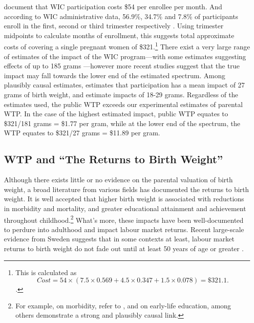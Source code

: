 \documentclass[a4paper, 11pt]{article}
\begin{document}
\begin{spacing}{1.4}
\citet{BenShalometal2011} document that WIC participation costs
\$54 per enrollee per month.  And according to WIC administrative
data, 56.9\%, 34.7\% and 7.8\% of participants enroll in the first,
second or third trimester respectively \citep{Johnsonetal2013}.  Using trimester midpoints
to calculate months of enrollment, this suggests total approximate
costs of covering a single pregnant women of \$321.\footnote{This
  is calculated
  as \[
  Cost = 54\times (7.5\times0.569+4.5\times0.347+1.5\times0.078) = \$321.1.
  \].}
There exist a very large range of estimates of the impact of the WIC
program---with some estimates suggesting effects of up to 185 grams
\citep{KowaleskiJonesDuncan2011}---however more recent studies suggest
that the true impact may fall towards the lower end of the estimated
spectrum.  Among plausibly causal estimates, \citet{RossinSlater2013}
estimates that participation has a mean impact of 27 grams of birth weight,
and \citet{Hoynesetal2011} estimate impacts of 18-29 grams.  Regardless of
the estimates used, the public WTP exceeds our experimental estimates
of parental WTP.  In the case of the highest estimated impact, public
WTP equates to \$321/181 grams = \$1.77 per gram, while at the lower
end of the spectrum, the WTP equates to \$321/27 grams = \$11.89 per gram.




\subsection{WTP and ``The Returns to Birth Weight''}
\label{returnsBW}
Although there exists little or no evidence on the parental valuation of
birth weight, a broad literature from various fields has documented
the returns to birth weight.  It is well accepted that higher birth
weight is associated with reductions in morbidity and mortality, and
greater educational attainment and achievement throughout
childhood.\footnote{For example, on morbidity, refer to
  \citet{Almondetal2005,Oreopoulosetal2008,Guptaetal2013,Conleyetal2003},
  and on early-life education, among others \citet{Figlioetal2014,
    LinLiu2009,Fletcher2011,Bharadwajetal2017,TorcheEchevarria2011}
  demonstrate a strong and plausibly causal link.}  What's more, these
impacts have been well-documented to perdure into adulthood and impact
labour market returns.  Recent large-scale evidence from Sweden suggests
that in some contexts at least, labour market returns to birth weight do
not fade out until at least 50 years of age or greater
\citep{Bharadwajetal2015}.


\end{spacing}
\end{document}
